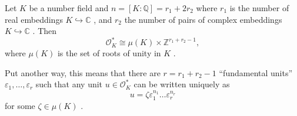  Let  $ K $  be a number field
and  $ n=[K: \mathbb{Q}]=r_1+2r_2 $  where  $ r_1 $  is the number of real embeddings
 $ K \hookrightarrow  \mathbb{C} $ , and  $ r_2 $  the number of pairs of complex
embeddings  $ K \hookrightarrow  \mathbb{C} $ . Then
 \[ \mathcal{O}_{K}^* \cong  \mu (K) \times  \mathbb{Z}^{r_1+r_2-1}, \]
where  $  \mu (K) $  is the set of roots of unity in  $ K $ .

Put another way, this means that there are  $ r=r_1+r_2-1 $  ``fundamental
units''  $  \varepsilon_1, \ldots, \varepsilon _r $  such that any unit
 $ u \in  \mathcal{O}_{K}^* $  can be written uniquely as
 \[u= \zeta  \varepsilon _1^{n_1} \ldots \varepsilon _r^{n_r} \]
for some  $  \zeta  \in \mu (K) $ .


